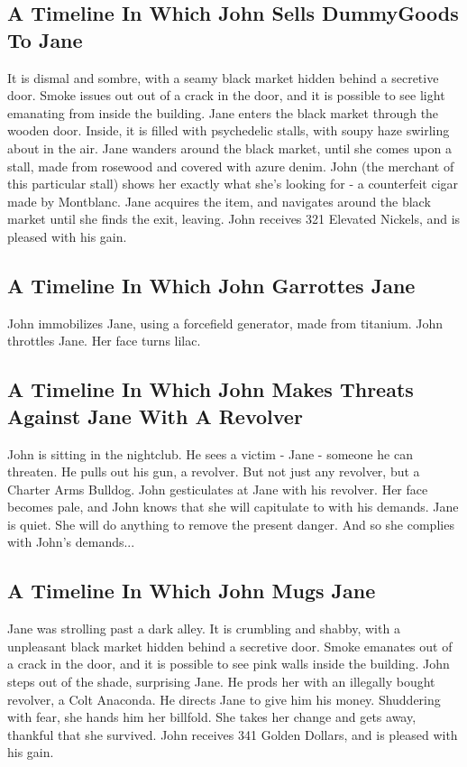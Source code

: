 \documentclass{article}
\begin{document}
\subsection{A Timeline In Which John Sells DummyGoods To Jane}


It is dismal and sombre, with a seamy black market hidden behind a secretive door.
Smoke issues out out of a crack in the door, and it is possible to see light emanating from inside the building.
Jane enters the black market through the wooden door.
Inside, it is filled with psychedelic stalls, with soupy haze swirling about in the air.
Jane wanders around the black market, until she comes upon a stall, made from rosewood and covered with azure denim.
John (the merchant of this particular stall) shows her exactly what she's looking for {-} a counterfeit cigar made by Montblanc.
Jane acquires the item, and navigates around the black market until she finds the exit, leaving.
John receives 321 Elevated Nickels, and is pleased with his gain.
\subsection{A Timeline In Which John Garrottes Jane}


John immobilizes Jane, using a forcefield generator, made from titanium.
John throttles Jane.
Her face turns lilac.
\subsection{A Timeline In Which John Makes Threats Against Jane With A Revolver}


John is sitting in the nightclub.
He sees a victim {-} Jane {-} someone he can threaten. He pulls out his gun, a revolver.
But not just any revolver, but a Charter Arms Bulldog.
John gesticulates at Jane with his revolver. Her face becomes pale, and John knows that she will capitulate to with his demands.
Jane is quiet. She will do anything to remove the present danger. And so she complies with John's demands...
\subsection{A Timeline In Which John Mugs Jane}


Jane was strolling past a dark alley.
It is crumbling and shabby, with a unpleasant black market hidden behind a secretive door.
Smoke emanates out of a crack in the door, and it is possible to see pink walls inside the building.
John steps out of the shade, surprising Jane.
He prods her with an illegally bought revolver, a Colt Anaconda.
He directs Jane to give him his money.
Shuddering with fear, she hands him her billfold.
She takes her change and gets away, thankful that she survived.
John receives 341 Golden Dollars, and is pleased with his gain.
\end{document}
